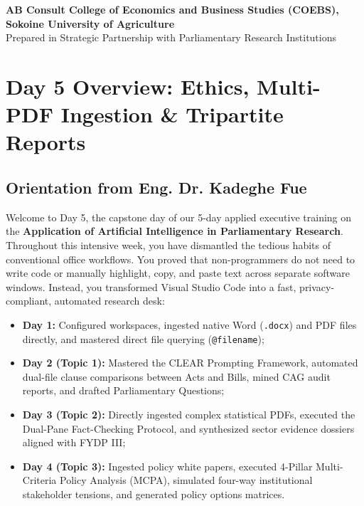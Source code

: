 \documentclass[11pt, a4paper]{report}
\begin{document}
\begin{titlepage}
    \vfill
    {\footnotesize \textbf{AB Consult \textbullet{} College of Economics and Business Studies (COEBS), Sokoine University of Agriculture}\\
    Prepared in Strategic Partnership with Parliamentary Research Institutions}
    \vspace*{0.2cm}
\end{titlepage}

\tableofcontents
\newpage

\chapter{Day 5 Overview: Ethics, Multi-PDF Ingestion \& Tripartite Reports}

\section{Orientation from Eng. Dr. Kadeghe Fue}
Welcome to Day 5, the capstone day of our 5-day applied executive training on the \textbf{Application of Artificial Intelligence in Parliamentary Research}. Throughout this intensive week, you have dismantled the tedious habits of conventional office workflows. You proved that non-programmers do not need to write code or manually highlight, copy, and paste text across separate software windows. Instead, you transformed Visual Studio Code into a fast, privacy-compliant, automated research desk:
\begin{itemize}[label=-]
    \item \textbf{Day 1:} Configured workspaces, ingested native Word (\texttt{.docx}) and PDF files directly, and mastered direct file querying (\texttt{@filename});
    \item \textbf{Day 2 (Topic 1):} Mastered the CLEAR Prompting Framework, automated dual-file clause comparisons between Acts and Bills, mined CAG audit reports, and drafted Parliamentary Questions;
    \item \textbf{Day 3 (Topic 2):} Directly ingested complex statistical PDFs, executed the Dual-Pane Fact-Checking Protocol, and synthesized sector evidence dossiers aligned with FYDP III;
    \item \textbf{Day 4 (Topic 3):} Ingested policy white papers, executed 4-Pillar Multi-Criteria Policy Analysis (MCPA), simulated four-way institutional stakeholder tensions, and generated policy options matrices.
\end{itemize}
\end{document}
